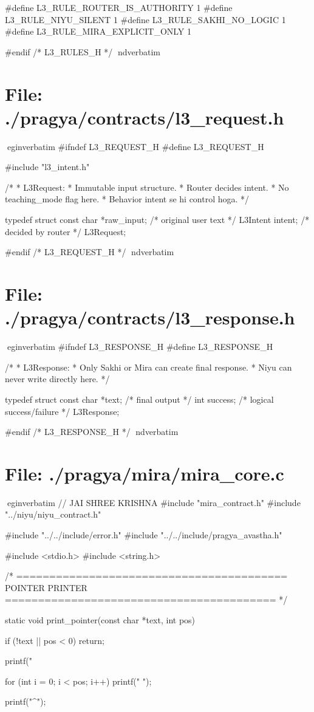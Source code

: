 \documentclass{article}
\begin{document}
#define L3_RULE_ROUTER_IS_AUTHORITY 1
#define L3_RULE_NIYU_SILENT         1
#define L3_RULE_SAKHI_NO_LOGIC      1
#define L3_RULE_MIRA_EXPLICIT_ONLY  1

#endif /* L3_RULES_H */
nd{verbatim}
\section*{File: ./pragya/contracts/l3_request.h}
egin{verbatim}
#ifndef L3_REQUEST_H
#define L3_REQUEST_H

#include "l3_intent.h"

/*
 * L3Request:
 * Immutable input structure.
 * Router decides intent.
 * No teaching_mode flag here.
 * Behavior intent se hi control hoga.
 */

typedef struct {
    const char *raw_input;     /* original user text */
    L3Intent    intent;        /* decided by router */
} L3Request;

#endif /* L3_REQUEST_H */
nd{verbatim}
\section*{File: ./pragya/contracts/l3_response.h}
egin{verbatim}
#ifndef L3_RESPONSE_H
#define L3_RESPONSE_H

/*
 * L3Response:
 * Only Sakhi or Mira can create final response.
 * Niyu can never write directly here.
 */

typedef struct {
    const char *text;      /* final output */
    int         success;   /* logical success/failure */
} L3Response;

#endif /* L3_RESPONSE_H */
nd{verbatim}
\section*{File: ./pragya/mira/mira_core.c}
egin{verbatim}
// JAI SHREE KRISHNA
#include "mira_contract.h"
#include "../niyu/niyu_contract.h"

#include "../../include/error.h"
#include "../../include/pragya_avastha.h"

#include <stdio.h>
#include <string.h>


/* =========================================
   POINTER PRINTER
========================================= */

static void print_pointer(const char *text, int pos)
{
    if (!text || pos < 0)
        return;

    printf("%

    for (int i = 0; i < pos; i++)
        printf(" ");

    printf("^\n\n");
}
\end{document}
